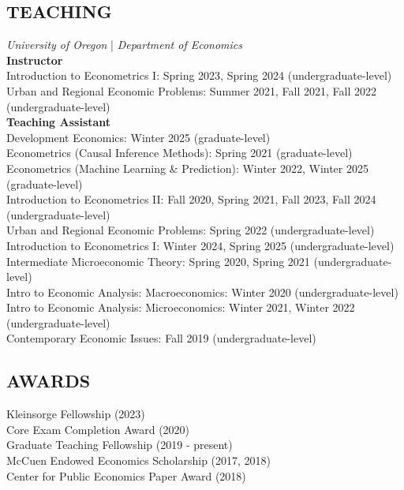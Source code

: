 \documentclass[11pt]{article}
\begin{document}

\subsection*{TEACHING}
\textit{University of Oregon} | \textit{Department of Economics} \\
\vspace{0.25em}
\textbf{Instructor} \\
Introduction to Econometrics I: Spring 2023, Spring 2024 (undergraduate-level) \\
Urban and Regional Economic Problems: Summer 2021, Fall 2021, Fall 2022 (undergraduate-level) \\
\vspace{0.25em}
\textbf{Teaching Assistant} \\
Development Economics: Winter 2025 (graduate-level) \\
Econometrics (Causal Inference Methods): Spring 2021 (graduate-level) \\
Econometrics (Machine Learning \& Prediction): Winter 2022, Winter 2025 (graduate-level) \\
Introduction to Econometrics II: Fall 2020, Spring 2021, Fall 2023, Fall 2024 (undergraduate-level) \\
Urban and Regional Economic Problems: Spring 2022 (undergraduate-level) \\
Introduction to Econometrics I: Winter 2024, Spring 2025 (undergraduate-level) \\
Intermediate Microeconomic Theory: Spring 2020, Spring 2021 (undergraduate-level) \\
Intro to Economic Analysis: Macroeconomics: Winter 2020 (undergraduate-level) \\
Intro to Economic Analysis: Microeconomics: Winter 2021, Winter 2022 (undergraduate-level) \\
Contemporary Economic Issues: Fall 2019 (undergraduate-level) \\


\subsection*{AWARDS}
Kleinsorge Fellowship (2023) \\
Core Exam Completion Award (2020) \\
Graduate Teaching Fellowship (2019 - present) \\
McCuen Endowed Economics Scholarship (2017, 2018) \\
Center for Public Economics Paper Award (2018) \\
\end{document}
